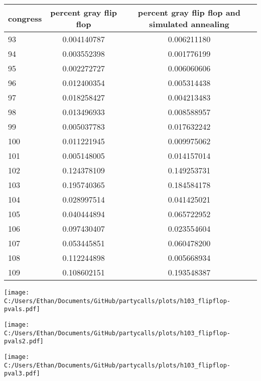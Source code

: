 \documentclass[12pt]{article}
\begin{document}
\begin{table}

\begin{tabular}[!hb]{lcc}
	\hline
  congress &  percent gray flip flop & percent gray flip flop and simulated annealing \\
  \hline
  \hline 
      93 & 0.004140787 & 0.006211180 \\
  
      94 & 0.003552398 & 0.001776199 \\
  
      95 & 0.002272727 & 0.006060606 \\
  
      96 & 0.012400354 & 0.005314438 \\
  
      97 & 0.018258427 & 0.004213483 \\
  
      98 & 0.013496933 & 0.008588957 \\
  
      99 & 0.005037783 & 0.017632242 \\
  
      100 & 0.011221945 & 0.009975062 \\
  
      101 & 0.005148005 & 0.014157014 \\
  
      102 & 0.124378109 & 0.149253731 \\
  
      103 & 0.195740365 & 0.184584178 \\
  
      104 & 0.028997514 & 0.041425021 \\
  
      105 & 0.040444894 & 0.065722952 \\
  
      106 & 0.097430407 & 0.023554604 \\
  
      107 & 0.053445851 & 0.060478200 \\
  
      108 & 0.112244898 & 0.005668934 \\
  
      109 & 0.108602151 & 0.193548387 \\
      
      \hline
  
  \end{tabular}
  
\end{table}


\texttt{[image: C:/Users/Ethan/Documents/GitHub/partycalls/plots/h103\_flipflop-pvals.pdf]}

\texttt{[image: C:/Users/Ethan/Documents/GitHub/partycalls/plots/h103\_flipflop-pvals2.pdf]}

\texttt{[image: C:/Users/Ethan/Documents/GitHub/partycalls/plots/h103\_flipflop-pval3.pdf]}

	
\end{document}
